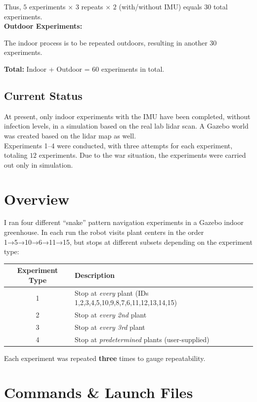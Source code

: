 \documentclass[11pt]{article}
\begin{document}
Thus, $5$ experiments $\times$ $3$ repeats $\times$ $2$ (with/without IMU) equals $30$ total experiments. \\

\textbf{Outdoor Experiments:}

The indoor process is to be repeated outdoors, resulting in another $30$ experiments.

\textbf{Total:} Indoor + Outdoor = $60$ experiments in total.

\subsection{Current Status}

At present, only indoor experiments with the IMU have been completed, without infection levels, in a simulation based on the real lab lidar scan. A Gazebo world was created based on the lidar map as well. \\
Experiments 1–4 were conducted, with three attempts for each experiment, totaling $12$ experiments.
Due to the war situation, the experiments were carried out only in simulation.

\section{Overview}
I ran four different “snake” pattern navigation experiments in a Gazebo indoor greenhouse.  In each run the robot visits plant centers in the order 
1→5→10→6→11→15, but stops at different subsets depending on the experiment type:

\begin{center}
\begin{tabular}{@{}cl@{}}
\toprule
\textbf{Experiment Type} & \textbf{Description} \\
\midrule
1 & Stop at \emph{every} plant (IDs 1,2,3,4,5,10,9,8,7,6,11,12,13,14,15) \\
2 & Stop at \emph{every 2nd} plant\\
3 & Stop at \emph{every 3rd} plant \\
4 & Stop at \emph{predetermined} plants (user-supplied) \\
\bottomrule
\end{tabular}
\end{center}

Each experiment was repeated {\bf three} times to gauge repeatability.

\section{Commands \& Launch Files}
\end{document}
